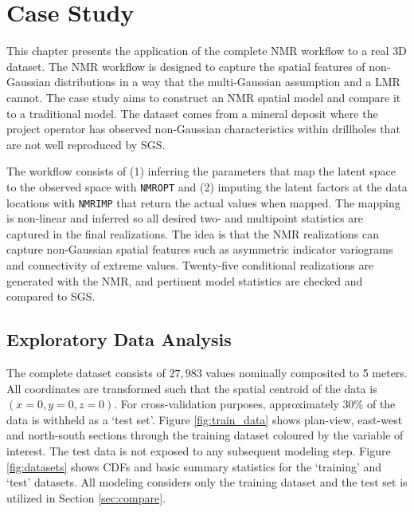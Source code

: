 
\chapter{Case Study}
\label{ch:casestudy}

This chapter presents the application of the complete \gls{NMR} workflow to a real \gls{3D} dataset. The \gls{NMR} workflow is designed to capture the spatial features of non‐Gaussian distributions in a way that the multi-Gaussian assumption and a \gls{LMR} cannot. The case study aims to construct an \gls{NMR} spatial model and compare it to a traditional model. The dataset comes from a mineral deposit where the project operator has observed non-Gaussian characteristics within drillholes that are not well reproduced by \gls{SGS}.

The workflow consists of (1) inferring the parameters that map the latent space to the observed space with \texttt{NMROPT} and (2) imputing the latent factors at the data locations with \texttt{NMRIMP} that return the actual values when mapped. The mapping is non-linear and inferred so all desired two- and multipoint statistics are captured in the final realizations. The idea is that the \gls{NMR} realizations can capture non-Gaussian spatial features such as asymmetric indicator variograms and connectivity of extreme values. Twenty-five conditional realizations are generated with the \gls{NMR}, and pertinent model statistics are checked and compared to \gls{SGS}.

\FloatBarrier
\section{Exploratory Data Analysis}
\label{sec:eda}

The complete dataset consists of $27,983$ values nominally composited to 5 meters. All coordinates are transformed such that the spatial centroid of the data is $(x=0,y=0,z=0)$. For cross-validation purposes, approximately 30\% of the data is withheld as a `test set'. Figure \ref{fig:train_data} shows plan-view, east-west and north-south sections through the training dataset coloured by the variable of interest. The test data is not exposed to any subsequent modeling step. Figure \ref{fig:datasets} shows \glspl{CDF} and basic summary statistics for the `training' and `test' datasets. All modeling considers only the training dataset and the test set is utilized in Section \ref{sec:compare}.

